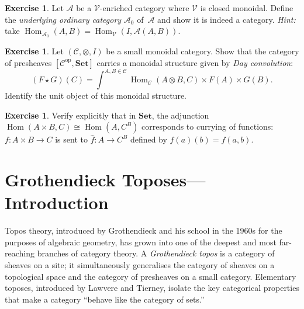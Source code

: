 \documentclass[a4paper,12pt]{book}
\DeclareMathOperator{\Hom}{Hom}
\newcommand{\Set}{\mathbf{Set}}
\newcommand{\op}{\mathrm{op}}
\theoremstyle{definition}
\newtheorem{exercise}[definition]{Exercise}
\theoremstyle{plain}
\theoremstyle{remark}
\begin{document}
\begin{exercise}\label{ex:enriched-underlying}
Let $\mathcal{A}$ be a $\mathcal{V}$-enriched category where
$\mathcal{V}$ is closed monoidal.  Define the \emph{underlying ordinary
category} $\mathcal{A}_0$ of~$\mathcal{A}$ and show it is indeed a category.
\textit{Hint:} take $\Hom_{\mathcal{A}_0}(A,B) = \Hom_\mathcal{V}(I, \mathcal{A}(A,B))$.
\end{exercise}

\begin{exercise}\label{ex:day-convolution}
Let $(\mathcal{C}, \otimes, I)$ be a small monoidal category.
Show that the category of presheaves $[\mathcal{C}^{\op}, \Set]$ carries
a monoidal structure given by \emph{Day convolution}:
\[
    (F\star G)(C)
    = \int^{A,B\in\mathcal{C}} \Hom_\mathcal{C}(A\otimes B, C)
      \times F(A)\times G(B).
\]
Identify the unit object of this monoidal structure.
\end{exercise}

\begin{exercise}\label{ex:ccc-lambda}
Verify explicitly that in $\Set$, the adjunction
$\Hom(A\times B, C)\cong\Hom(A, C^B)$ corresponds to currying of functions:
$f\colon A\times B\to C$ is sent to $\hat{f}\colon A\to C^B$ defined by
$\hat{f}(a)(b) = f(a,b)$.
\end{exercise}




\chapter{Grothendieck Toposes---Introduction}\label{ch:toposes}
\minitoc

\vspace{1em}

Topos theory, introduced by Grothendieck and his school in the 1960s
for the purposes of algebraic geometry, has grown into one of the deepest
and most far-reaching branches of category theory.  A \emph{Grothendieck
topos} is a category of sheaves on a site; it simultaneously generalises
the category of sheaves on a topological space and the category of
presheaves on a small category.  Elementary toposes, introduced by
Lawvere and Tierney, isolate the key categorical properties that make
a category ``behave like the category of sets.''
\end{document}
